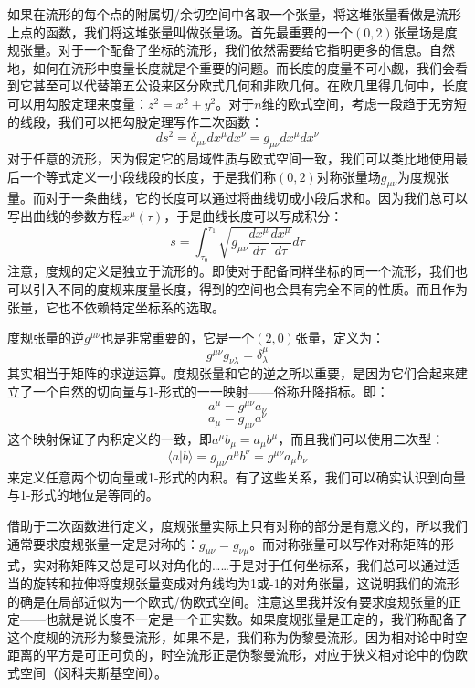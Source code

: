 \documentclass{ctexart}
\begin{document}
如果在流形的每个点的附属切/余切空间中各取一个张量，将这堆张量看做是流形上点的函数，我们将这堆张量叫做张量场。首先最重要的一个$(0,2)$张量场是度规张量。对于一个配备了坐标的流形，我们依然需要给它指明更多的信息。自然地，如何在流形中度量长度就是个重要的问题。而长度的度量不可小觑，我们会看到它甚至可以代替第五公设来区分欧式几何和非欧几何。在欧几里得几何中，长度可以用勾股定理来度量：$z^2=x^2+y^2$。对于$n$维的欧式空间，考虑一段趋于无穷短的线段，我们可以把勾股定理写作二次函数：
\begin{equation}
ds^2=\delta_{\mu\nu}dx^\mu dx^\nu=g_{\mu\nu}dx^\mu dx^\nu
\end{equation}
对于任意的流形，因为假定它的局域性质与欧式空间一致，我们可以类比地使用最后一个等式定义一小段线段的长度，于是我们称$(0,2)$对称张量场$g_{\mu\nu}$为度规张量。而对于一条曲线，它的长度可以通过将曲线切成小段后求和。因为我们总可以写出曲线的参数方程$x^\mu(\tau)$，于是曲线长度可以写成积分：
\begin{equation}
s=\int_{\tau_0}^{\tau_1}\sqrt{g_{\mu\nu}\frac{dx^\mu}{d\tau}\frac{dx^\mu}{d\tau}}d\tau
\end{equation}
注意，度规的定义是独立于流形的。即使对于配备同样坐标的同一个流形，我们也可以引入不同的度规来度量长度，得到的空间也会具有完全不同的性质。而且作为张量，它也不依赖特定坐标系的选取。

度规张量的逆$g^{\mu\nu}$也是非常重要的，它是一个$(2,0)$张量，定义为：
\begin{equation}
g^{\mu\nu}g_{\nu\lambda}=\delta^\mu_\lambda
\end{equation}
其实相当于矩阵的求逆运算。度规张量和它的逆之所以重要，是因为它们合起来建立了一个自然的切向量与1-形式的一一映射——俗称升降指标。即：
\begin{equation}
a^\mu=g^{\mu\nu}a_\nu
\end{equation}
\begin{equation}
a_\mu=g_{\mu\nu}a^\nu
\end{equation}
这个映射保证了内积定义的一致，即$a^\mu b_\mu=a_\mu b^\mu$，而且我们可以使用二次型：
\begin{equation}
\langle a|b\rangle=g_{\mu\nu}a^\mu b^\nu=g^{\mu\nu}a_\mu b_\nu
\end{equation}
来定义任意两个切向量或1-形式的内积。有了这些关系，我们可以确实认识到向量与1-形式的地位是等同的。

借助于二次函数进行定义，度规张量实际上只有对称的部分是有意义的，所以我们通常要求度规张量一定是对称的：$g_{\mu\nu}=g_{\nu\mu}$。而对称张量可以写作对称矩阵的形式，实对称矩阵又总是可以对角化的……于是对于任何坐标系，我们总可以通过适当的旋转和拉伸将度规张量变成对角线均为1或-1的对角张量，这说明我们的流形的确是在局部近似为一个欧式/伪欧式空间。注意这里我并没有要求度规张量的正定——也就是说长度不一定是一个正实数。如果度规张量是正定的，我们称配备了这个度规的流形为黎曼流形，如果不是，我们称为伪黎曼流形。因为相对论中时空距离的平方是可正可负的，时空流形正是伪黎曼流形，对应于狭义相对论中的伪欧式空间（闵科夫斯基空间）。
\end{document}
